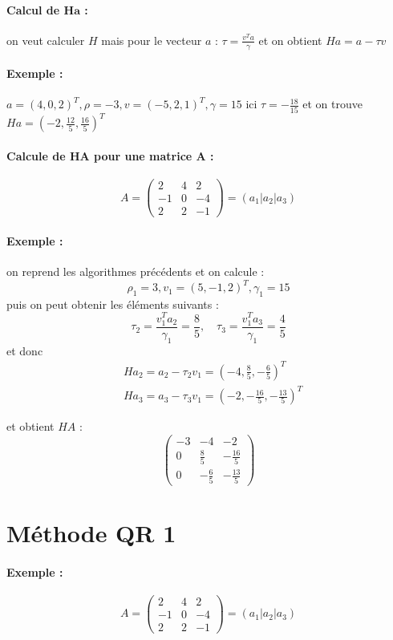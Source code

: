 \documentclass[a4paper,9pt]{extarticle}
\begin{document}
\paragraph*{Calcul de $\textbf{Ha}$ : } on veut calculer $H$ mais pour le vecteur $a$ : $\tau = \frac{v^Ta}{\gamma}$ et on obtient $Ha=a-\tau v$

\paragraph*{Exemple : } $a=(4,0,2)^T, \rho=-3, v=(-5,2,1)^T, \gamma = 15$ ici $\tau = -\frac{18}{15}$ et on trouve $Ha = (-2,\frac{12}{5},\frac{16}{5})^T$

\paragraph*{Calcule de $\textbf{HA}$ pour une matrice $\textbf{A}$ : } 
$$
A = \begin{pmatrix}
2 & 4 & 2\\
-1 & 0 & -4 \\
2 & 2 & -1
\end{pmatrix} = (a_1|a_2|a_3)
$$

\paragraph*{Exemple : } on reprend les algorithmes précédents et on calcule :
$$
\rho_1 = 3, v_1 = (5,-1,2)^T, \gamma_1 = 15
$$
puis on peut obtenir les éléments suivants :
$$
\tau_2 = \frac{v^T_1 a_2}{\gamma_1} = \frac{8}{5}, \quad 
\tau_3 = \frac{v^T_1 a_3}{\gamma_1} = \frac{4}{5}
$$
et donc
\begin{align*}
& Ha_2 = a_2 - \tau_2v_1 = (-4,\frac{8}{5},-\frac{6}{5})^T \\
& Ha_3 = a_3 - \tau_3v_1 = (-2,-\frac{16}{5},-\frac{13}{5})^T
\end{align*}

et obtient $HA$ :
$$
\begin{pmatrix}
-3 & -4 & -2 \\
0 & \frac{8}{5} & -\frac{16}{5} \\
0 & -\frac{6}{5} & -\frac{13}{5}
\end{pmatrix}
$$

\section{Méthode QR 1}

\paragraph*{Exemple : }
$$
A = \begin{pmatrix}
2 & 4 & 2 \\
-1 & 0 & -4 \\
2 & 2 & -1
\end{pmatrix} = (a_1|a_2|a_3)
$$
\end{document}
